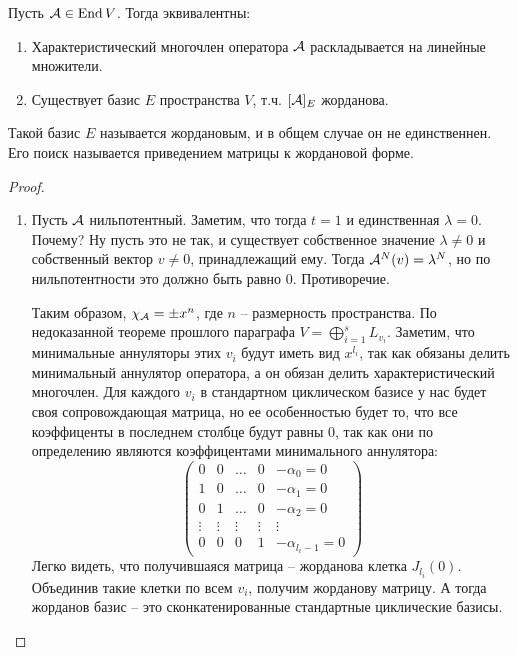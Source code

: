 \begin{theorem-non}
    Пусть $\mathcal{A} \in \operatorname{End} V$. Тогда эквивалентны: \begin{enumerate}
        \item Характеристический многочлен оператора $\mathcal{A}$ раскладывается на линейные множители.
        \item Существует базис $E$ пространства $V$, т.ч. $[\mathcal{A}]_E$ жорданова. 
    \end{enumerate}
    Такой базис $E$ называется жордановым, и в общем случае он не единственнен. 
    Его поиск называется приведением матрицы к жордановой форме.
\end{theorem-non}
\begin{proof} \quad 

    \begin{enumerate}
        \item Пусть $\mathcal{A}$ нильпотентный.
        Заметим, что тогда $t = 1$ и единственная $\lambda = 0$.
        Почему? Ну пусть это не так, и существует собственное значение $\lambda \neq 0$ и собственный вектор $v \neq 0$, принадлежащий ему.
        Тогда $\mathcal{A}^N(v) = \lambda^N$, но по нильпотентности это должно быть равно 0. Противоречие.
    
        Таким образом, $\chi_{\mathcal{A}} = \pm x^n$, где $n$ -- размерность пространства.
        По недоказанной теореме прошлого параграфа $V = \bigoplus\limits_{i=1}^s L_{v_i}$.
        Заметим, что минимальные аннуляторы этих $v_i$ будут иметь вид $x^{l_i}$, так как обязаны делить минимальный аннулятор оператора, а он обязан делить характеристический многочлен.
        Для каждого $v_i$ в стандартном циклическом базисе у нас будет своя сопровождающая матрица, но ее особенностью будет то, что все коэффиценты в последнем столбце будут равны 0, так как они по определению являются коэффицентами минимального аннулятора:
        \[
            \left(\begin{array}{ccccc}
            0 & 0 & \dots & 0 & -\alpha_0 = 0 \\ 
            1 & 0 & \dots & 0 & -\alpha_1 = 0 \\ 
            0 & 1 & \dots & 0 & -\alpha_2 = 0 \\ 
            \vdots & \vdots & \vdots & \vdots & \vdots \\ 
            0 & 0 & 0 & 1 & -\alpha_{l_i - 1} = 0
        \end{array}\right)    
        \]
        Легко видеть, что получившаяся матрица -- жорданова клетка $J_{l_i}(0)$. 
        Объединив такие клетки по всем $v_i$, получим жорданову матрицу. 
        А тогда жорданов базис -- это сконкатенированные стандартные циклические базисы.


\end{enumerate}
\end{proof}
